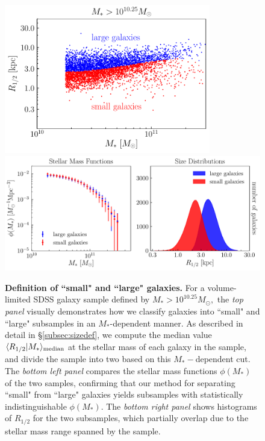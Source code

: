 \documentclass[usenatbib,usegraphicx,letterpaper]{mn2e}
\newcommand{\rhalf}{R_{1/2}}
\newcommand{\mstar}{M_{\ast}}
\newcommand{\median}[2]{\langle{#1}\vert{#2}\rangle_{\rm median}}
\begin{document}
\begin{figure}
\centering
\includegraphics[width=9cm]{FIGS/sdss_size_vs_mstar_scatter.pdf}
\includegraphics[width=\textwidth]{FIGS/sdss_small_large_sample_definitions.pdf}
\caption{
{\bf Definition of ``small" and ``large" galaxies.} For a volume-limited SDSS galaxy sample defined by $M_{\ast}>10^{10.25}M_{\odot},$ the {\em top panel} visually demonstrates how we classify galaxies into ``small" and ``large" subsamples in an $\mstar$-dependent manner. As described in detail in \S\ref{subsec:sizedef}, we compute the median value $\median{\rhalf}{\mstar}$ at the stellar mass of each galaxy in the sample, and divide the sample into two based on this $\mstar-$dependent cut. The {\em bottom left panel} compares the stellar mass functions $\phi(\mstar)$ of the two samples, confirming that our method for separating ``small" from ``large" galaxies yields subsamples with statistically indistinguishable $\phi(\mstar)$. The {\em bottom right panel} shows histograms of $\rhalf$ for the two subsamples, which partially overlap due to the stellar mass range spanned by the sample.
}
\label{fig:sizedefinition}
\end{figure}
\end{document}
